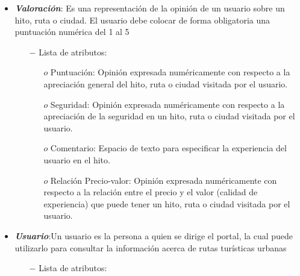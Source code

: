 \documentclass[a4paper]{article}
\begin{document}
\begin{itemize}
{\begin{itemize}
    \end{itemize}

}



\item{
	\textbf{\textit{Valoración}}: Es una representación de la opinión de un usuario sobre un hito, ruta o ciudad. El usuario debe colocar de forma obligatoria una puntuación numérica del 1 al 5
  		
     \begin{itemize}   
  		\item[$-$] Lista de atributos:

	\begin{itemize}
		 
        
         \item[$o$]Puntuación: Opinión expresada numéricamente con respecto a la apreciación  general del hito, ruta o ciudad visitada por el usuario.
\item[$o$]Seguridad: Opinión expresada numéricamente con respecto a la apreciación de la seguridad en un hito, ruta o ciudad visitada por el usuario.
\item[$o$]Comentario: Espacio de texto para especificar la experiencia del usuario en el hito.
\item[$o$]Relación Precio-valor: Opinión expresada numéricamente con respecto a la relación entre el precio y el valor (calidad de experiencia) que puede tener un hito, ruta o ciudad visitada por el usuario.



	\end{itemize}


    \end{itemize}

}



\item{
	\textbf{\textit{Usuario}}:Un usuario es la persona a quien se dirige el portal, la cual puede utilizarlo para consultar la información acerca de rutas turísticas urbanas  
  		
     \begin{itemize}   
  		\item[$-$] Lista de atributos:

	\begin{itemize}
		

\end{itemize}
\end{itemize}}
\end{itemize}
\end{document}
